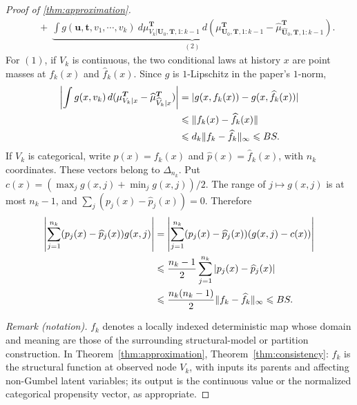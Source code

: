 \begin{proof}[Proof of \cref{thm:approximation}]
\begin{align*}
   & \ \ \ +\ \underbrace{\int g(\boldsymbol{u} ,\boldsymbol{t} ,v_{1} ,\cdots ,v_{k}) \ d\mu _{V_{k} |\boldsymbol{U}_0 ,\boldsymbol{T} ,1:k-1}^{\boldsymbol{T}} \ d\left( \mu _{\boldsymbol{U}_0 ,\boldsymbol{T} ,1:k-1}^{\boldsymbol{T}} -\hat{\mu }_{\hat{\boldsymbol{U}}_0 ,\boldsymbol{T} ,1:k-1}^{\boldsymbol{T}}\right)}_{( 2)} .
  \end{align*}
For $(1)$, if $V_k$ is continuous, the two conditional laws at history $x$ are point masses at $f_k(x)$ and $\hat f_k(x)$. Since $g$ is $1$-Lipschitz in the paper's $1$-norm,
\begin{align}\label{eq:approximation_1}
\left|\int g(x,v_k)\,d(\mu_{V_k|x}^{\boldsymbol T}-\hat\mu_{\hat V_k|x}^{\boldsymbol T})\right|
&=|g(x,f_k(x))-g(x,\hat f_k(x))|\notag\\
&\leqslant\|f_k(x)-\hat f_k(x)\|\notag\\
&\leqslant d_k\|f_k-\hat f_k\|_\infty\leqslant BS.
\end{align}
  If $V_k$ is categorical, write $p(x)=f_k(x)$ and $\hat p(x)=\hat f_k(x)$, with $n_k$ coordinates. These vectors belong to $\Delta_{n_k}$. Put $c(x)=(\max_jg(x,j)+\min_jg(x,j))/2$. The range of $j\mapsto g(x,j)$ is at most $n_k-1$, and $\sum_j(p_j(x)-\hat p_j(x))=0$. Therefore
\begin{align}\label{eq:cate_1}
\left|\sum_{j=1}^{n_k}(p_j(x)-\hat p_j(x))g(x,j)\right|
&=\left|\sum_{j=1}^{n_k}(p_j(x)-\hat p_j(x))(g(x,j)-c(x))\right|\notag\\
&\leqslant\frac{n_k-1}{2}\sum_{j=1}^{n_k}|p_j(x)-\hat p_j(x)|\notag\\
&\leqslant\frac{n_k(n_k-1)}2\|f_k-\hat f_k\|_\infty\leqslant BS.
\end{align} 

\noindent\textit{Remark (notation).} $f_k$ denotes a locally indexed deterministic map whose domain and meaning are those of the surrounding structural-model or partition construction. In Theorem~\ref{thm:approximation}, Theorem~\ref{thm:consistency}: $f_k$ is the structural function at observed node $V_k$, with inputs its parents and affecting non-Gumbel latent variables; its output is the continuous value or the normalized categorical propensity vector, as appropriate.



\end{proof}

